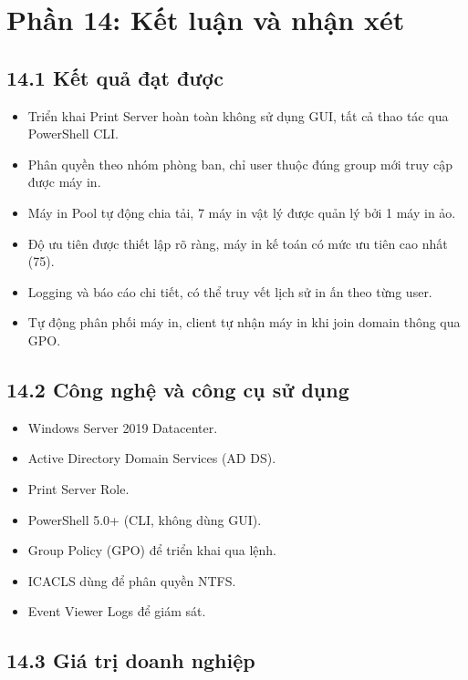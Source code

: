 \section*{Phần 14: Kết luận và nhận xét}

\subsection*{14.1 Kết quả đạt được}

\begin{itemize}
    \item Triển khai Print Server hoàn toàn không sử dụng GUI, tất cả thao tác qua PowerShell CLI.
    \item Phân quyền theo nhóm phòng ban, chỉ user thuộc đúng group mới truy cập được máy in.
    \item Máy in Pool tự động chia tải, 7 máy in vật lý được quản lý bởi 1 máy in ảo.
    \item Độ ưu tiên được thiết lập rõ ràng, máy in kế toán có mức ưu tiên cao nhất (75).
    \item Logging và báo cáo chi tiết, có thể truy vết lịch sử in ấn theo từng user.
    \item Tự động phân phối máy in, client tự nhận máy in khi join domain thông qua GPO.
\end{itemize}

\subsection*{14.2 Công nghệ và công cụ sử dụng}

\begin{itemize}
    \item Windows Server 2019 Datacenter.
    \item Active Directory Domain Services (AD DS).
    \item Print Server Role.
    \item PowerShell 5.0+ (CLI, không dùng GUI).
    \item Group Policy (GPO) để triển khai qua lệnh.
    \item ICACLS dùng để phân quyền NTFS.
    \item Event Viewer Logs để giám sát.
\end{itemize}

\subsection*{14.3 Giá trị doanh nghiệp}


